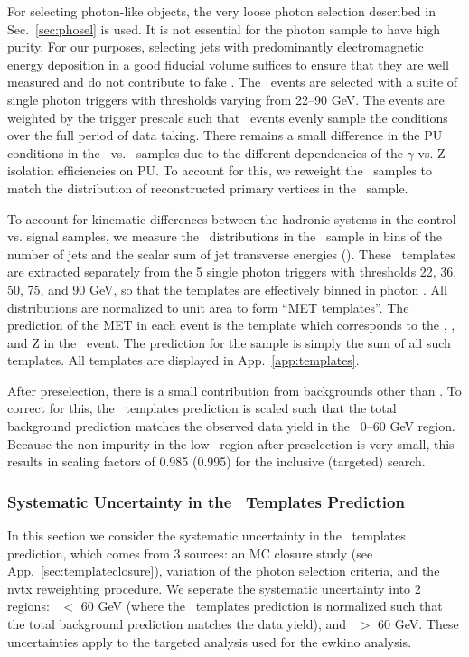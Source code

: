 For selecting photon-like objects, the very loose photon selection described in Sec.~\ref{sec:phosel} is used.
It is not essential for the photon sample to have high purity. For our purposes, selecting jets with predominantly 
electromagnetic energy deposition in a good fiducial volume suffices to ensure that 
they are well measured and do not contribute to fake \MET. The \gjets\ events are selected with a suite of
single photon triggers with \pt thresholds varying from 22--90 GeV. The events are weighted by the trigger prescale
such that \gjets\ events evenly sample the conditions over the full period of data taking.
There remains a small difference in the PU conditions in the \gjets\ vs. \zjets\ samples due to the different
dependencies of the $\gamma$ vs. Z isolation efficiencies on PU. To account for this, we reweight the \gjets\ samples
to match the distribution of reconstructed primary vertices in the \zjets\ sample.

To account for kinematic differences between the hadronic systems in the control vs. signal 
samples, we measure the \MET\ distributions in the \gjets\ sample in bins of the number of jets 
and the scalar sum of jet transverse energies (\Ht). These \MET\ templates are extracted separately from the 5 single photon
triggers with thresholds 22, 36, 50, 75, and 90 GeV, so that the templates are effectively binned in photon \pt.
All \MET distributions are normalized to unit area to form ``MET templates''.
The prediction of the MET in each \Z event is the template which corresponds to the \njets,
\Ht, and Z \pt in the \zjets\ event. The prediction for the \Z sample is simply the sum of all such templates.
All templates are displayed in App.~\ref{app:templates}.

After preselection, there is  a small contribution from backgrounds other than \zjets. To correct for this, the \MET\ templates
prediction is scaled such that the total background prediction matches the observed data yield in the \MET\ 0--60 GeV region.
Because the non-\zjets impurity in the low \MET\ region after preselection is very small, this results in 
scaling factors of 0.985 (0.995) for the inclusive (targeted) search.

\subsubsection{Systematic Uncertainty in the \MET\ Templates Prediction}
\label{sec:bkg_zjetssyst}

In this section we consider the systematic uncertainty in the \MET\ templates prediction, which comes from 3 sources:
an MC closure study (see App.~\ref{sec:templateclosure}), variation of the photon selection criteria, and the nvtx
reweighting procedure. We seperate the systematic uncertainty 
into 2 regions: \MET\ $<$ 60 GeV (where the \MET\ templates prediction is normalized such that the total background
prediction matches the data yield), and \MET\ $>$ 60 GeV. These uncertainties apply to the targeted analysis used for the ewkino analysis.

